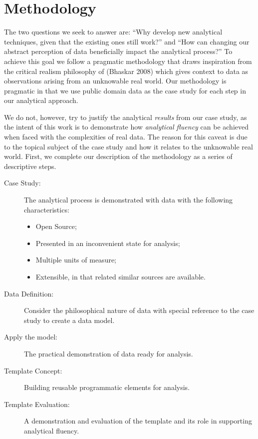 \documentclass[smallextended]{svjour3}       %
\begin{document}
\hypertarget{sec:methodology}{%
\section{Methodology}\label{sec:methodology}}

The two questions we seek to answer are: ``Why develop new analytical
techniques, given that the existing ones still work?'' and ``How can
changing our abstract perception of data beneficially impact the
analytical process?'' To achieve this goal we follow a pragmatic
methodology that draws inspiration from the critical realism philosophy
of (Bhaskar 2008) which gives context to data as observations arising
from an unknowable real world. Our methodology is pragmatic in that we
use public domain data as the case study for each step in our analytical
approach.

We do not, however, try to justify the analytical \emph{results} from our
case study, as the intent of this work is to demonstrate how \emph{analytical
fluency} can be achieved when faced with the complexities of real data.
The reason for this caveat is due to the topical subject of the case
study and how it relates to the unknowable real world. First, we
complete our description of the methodology as a series of descriptive
steps.

\begin{description}
\item[Case Study:]
The analytical process is demonstrated with data with the following
characteristics:

\begin{itemize}
\item
  Open Source;
\item
  Presented in an inconvenient state for analysis;
\item
  Multiple units of measure;
\item
  Extensible, in that related similar sources are available.
\end{itemize}
\item[Data Definition:]
Consider the philosophical nature of data with special reference to
the case study to create a data model.
\item[Apply the model:]
The practical demonstration of data ready for analysis.
\item[Template Concept:]
Building reusable programmatic elements for analysis.
\item[Template Evaluation:]
A demonstration and evaluation of the template and its role in
supporting analytical fluency.
\end{description}
\end{document}
